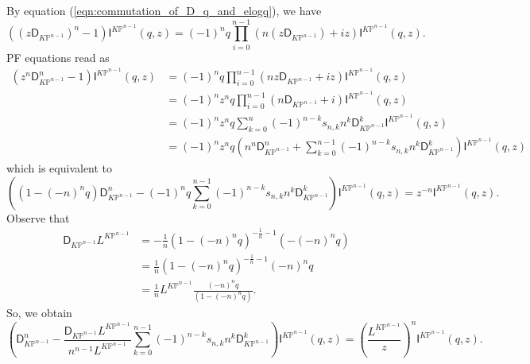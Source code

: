 \documentclass[12pt]{amsart}
\numberwithin{equation}{section}
\newcommand{\KP}{K\mathbb{P}}
\begin{document}
By equation (\ref{eqn:commutation_of_D_q_and_elogq}), we have 
\begin{equation}\label{eqn:PF3}
\left(\left(z\mathsf{D}_{K\mathbb{P}^{n-1}}\right)^n-1\right)\mathsf{I}^{\KP^{n-1}}(q,z)=(-1)^nq\prod_{i=0}^{n-1}\left(n\left(z\mathsf{D}_{K\mathbb{P}^{n-1}}\right)+iz\right)\mathsf{I}^{\KP^{n-1}}(q,z).        
\end{equation}
PF equations read as
\begin{equation*}
\begin{aligned}
\left(z^n\mathsf{D}_{\KP^{n-1}}^n-1\right)\mathsf{I}^{\KP^{n-1}}(q,z)
&=(-1)^nq\prod_{i=0}^{n-1}\left(nz\mathsf{D}_{\KP^{n-1}}+iz\right)\mathsf{I}^{\KP^{n-1}}(q,z)\\
&=(-1)^nz^nq\prod_{i=0}^{n-1}\left(n\mathsf{D}_{\KP^{n-1}}+i\right)\mathsf{I}^{\KP^{n-1}}(q,z)\\
&=(-1)^nz^nq\sum_{k=0}^{n}(-1)^{n-k}{s}_{n,k}n^k\mathsf{D}_{\KP^{n-1}}^k\mathsf{I}^{\KP^{n-1}}(q,z)\\
&=(-1)^nz^nq\left(n^n\mathsf{D}_{\KP^{n-1}}^n+\sum_{k=0}^{n-1}(-1)^{n-k}{s}_{n,k}n^k\mathsf{D}_{\KP^{n-1}}^k\right)\mathsf{I}^{\KP^{n-1}}(q,z)
\end{aligned}
\end{equation*}
which is equivalent to
\begin{equation}\label{eqn:PF_Eq_for_with_logq_factor}
\left({(1-(-n)^nq)}\mathsf{D}_{\KP^{n-1}}^n-(-1)^nq\sum_{k=0}^{n-1}(-1)^{n-k}{s}_{n,k}n^k\mathsf{D}_{\KP^{n-1}}^k\right)\mathsf{I}^{\KP^{n-1}}(q,z)=z^{-n}\mathsf{I}^{\KP^{n-1}}(q,z).
\end{equation}
Observe that 
\begin{equation}\label{eqn:DLL}
\begin{aligned}
\mathsf{D}_{\KP^{n-1}}L^{\KP^{n-1}}
&=-\frac{1}{n}(1-(-n)^nq)^{-\frac{1}{n}-1}\left(-(-n)^nq\right)\\
&=\frac{1}{n}(1-(-n)^nq)^{-\frac{1}{n}-1}(-n)^nq\\
&=\frac{1}{n}L^{\KP^{n-1}}\frac{(-n)^nq}{(1-(-n)^nq)}.
\end{aligned}
\end{equation}
So, we obtain 
\begin{equation}\label{eqn:PF_with_stirling_for_vert_I}
\left(\mathsf{D}_{\KP^{n-1}}^n-\frac{\mathsf{D}_{\KP^{n-1}}L^{\KP^{n-1}}}{n^{n-1}L^{\KP^{n-1}}}\sum_{k=0}^{n-1}(-1)^{n-k}{s}_{n,k}n^k\mathsf{D}_{\KP^{n-1}}^k\right)\mathsf{I}^{\KP^{n-1}}(q,z)=\left(\frac{L^{\KP^{n-1}}}{z}\right)^n\mathsf{I}^{\KP^{n-1}}(q,z).
\end{equation}
\end{document}
